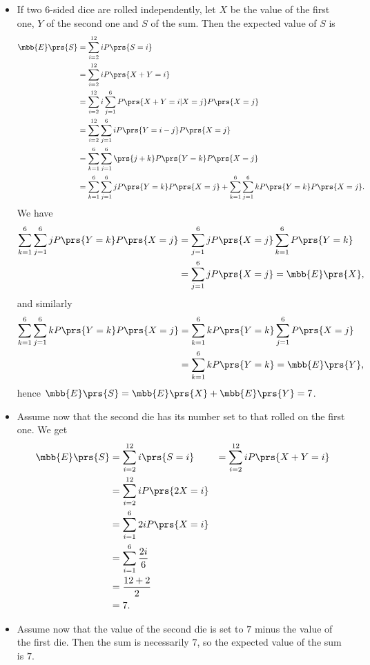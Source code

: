 \documentclass[oneside]{scrbook}
\theoremstyle{definition}
\begin{document}
\begin{exercise}
\begin{itemize}
\item If two $6$-sided dice are rolled independently, let $X$ be the value of the first one, $Y$ of the second one and $S$ of the sum. Then the expected value of $S$ is
\begin{align*}
\mbb{E}\prs{S} &= \sum_{i=2}^{12} i P\prs{S = i}
\\&= \sum_{i=2}^{12} i P\prs{X+Y = i}
\\&= \sum_{i=2}^{12} i \sum_{j=1}^6 P\prs{X+Y = i | X = j}P\prs{X = j}
\\&= \sum_{i=2}^{12} \sum_{j=1}^6 i P\prs{Y = i-j}P\prs{X = j}
\\&= \sum_{k=1}^6 \sum_{j=1}^6 \prs{j+k} P\prs{Y = k}P\prs{X = j}
\\&= \sum_{k=1}^6 \sum_{j=1}^6 j P\prs{Y = k}P\prs{X = j} + \sum_{k=1}^6 \sum_{j=1}^6 k P\prs{Y = k}P\prs{X = j} \text{.}
\end{align*}
We have
\begin{align*}
\sum_{k=1}^6 \sum_{j=1}^6 j P\prs{Y = k}P\prs{X = j} &= \sum_{j=1}^6 j P\prs{X=j} \sum_{k=1}^6 P\prs{Y=k}
\\&= \sum_{j=1}^6 j P\prs{X=j} = \mbb{E}\prs{X} \text{,}
\end{align*}
and similarly
\begin{align*}
\sum_{k=1}^6 \sum_{j=1}^6 k P\prs{Y = k}P\prs{X = j} &= \sum_{k=1}^6 k P\prs{Y=k} \sum_{j=1}^6 P\prs{X=j}
\\&= \sum_{k=1}^6 k P\prs{Y=k} = \mbb{E}\prs{Y} \text{,}
\end{align*}
hence $\mbb{E}\prs{S} = \mbb{E}\prs{X} + \mbb{E}\prs{Y} = 7$.

\item Assume now that the second die has its number set to that rolled on the first one. We get
\begin{align*}
\mbb{E}\prs{S} &= \sum_{i=2}^{12} i \prs{S = i}
&= \sum_{i=2}^{12} i P\prs{X+Y = i}
\\&= \sum_{i=2}^{12} i P\prs{2X = i}
\\&= \sum_{i=1}^6 2i P\prs{X = i}
\\&= \sum_{i=1}^6 \frac{2i}{6}
\\&= \frac{12 + 2}{2}
\\&= 7 \text{.}
\end{align*}

\item Assume now that the value of the second die is set to $7$ minus the value of the first die. Then the sum is necessarily $7$, so the expected value of the sum is $7$.
\end{itemize}
\end{exercise}
\end{document}
